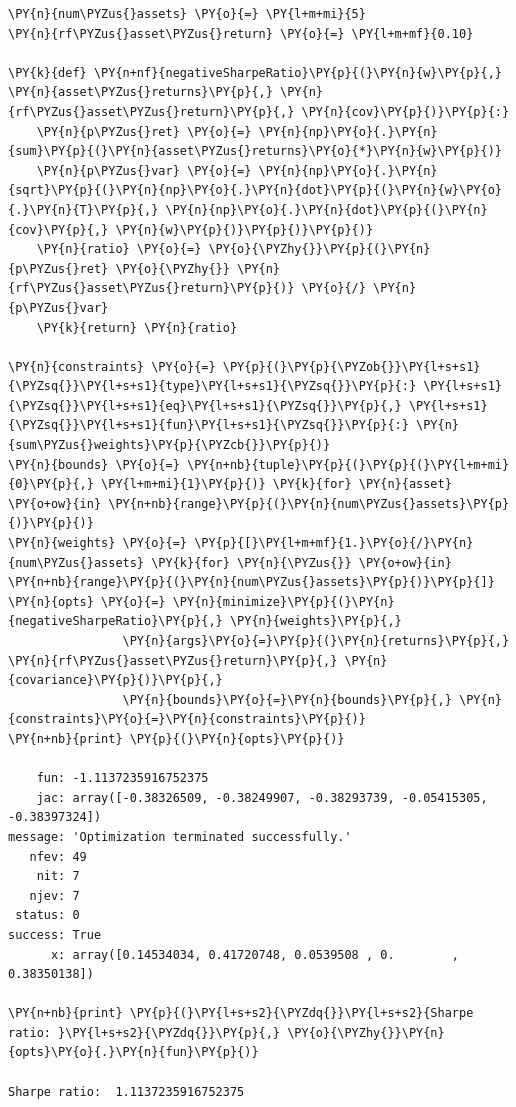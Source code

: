 \begin{tcolorbox}[breakable, size=fbox, boxrule=1pt, pad at break*=1mm,colback=cellbackground, colframe=cellborder]
\begin{Verbatim}[commandchars=\\\{\}]
\PY{n}{num\PYZus{}assets} \PY{o}{=} \PY{l+m+mi}{5}
\PY{n}{rf\PYZus{}asset\PYZus{}return} \PY{o}{=} \PY{l+m+mf}{0.10}
	
\PY{k}{def} \PY{n+nf}{negativeSharpeRatio}\PY{p}{(}\PY{n}{w}\PY{p}{,} \PY{n}{asset\PYZus{}returns}\PY{p}{,} \PY{n}{rf\PYZus{}asset\PYZus{}return}\PY{p}{,} \PY{n}{cov}\PY{p}{)}\PY{p}{:} 
    \PY{n}{p\PYZus{}ret} \PY{o}{=} \PY{n}{np}\PY{o}{.}\PY{n}{sum}\PY{p}{(}\PY{n}{asset\PYZus{}returns}\PY{o}{*}\PY{n}{w}\PY{p}{)}
    \PY{n}{p\PYZus{}var} \PY{o}{=} \PY{n}{np}\PY{o}{.}\PY{n}{sqrt}\PY{p}{(}\PY{n}{np}\PY{o}{.}\PY{n}{dot}\PY{p}{(}\PY{n}{w}\PY{o}{.}\PY{n}{T}\PY{p}{,} \PY{n}{np}\PY{o}{.}\PY{n}{dot}\PY{p}{(}\PY{n}{cov}\PY{p}{,} \PY{n}{w}\PY{p}{)}\PY{p}{)}\PY{p}{)}
    \PY{n}{ratio} \PY{o}{=} \PY{o}{\PYZhy{}}\PY{p}{(}\PY{n}{p\PYZus{}ret} \PY{o}{\PYZhy{}} \PY{n}{rf\PYZus{}asset\PYZus{}return}\PY{p}{)} \PY{o}{/} \PY{n}{p\PYZus{}var}
    \PY{k}{return} \PY{n}{ratio}
	
\PY{n}{constraints} \PY{o}{=} \PY{p}{(}\PY{p}{\PYZob{}}\PY{l+s+s1}{\PYZsq{}}\PY{l+s+s1}{type}\PY{l+s+s1}{\PYZsq{}}\PY{p}{:} \PY{l+s+s1}{\PYZsq{}}\PY{l+s+s1}{eq}\PY{l+s+s1}{\PYZsq{}}\PY{p}{,} \PY{l+s+s1}{\PYZsq{}}\PY{l+s+s1}{fun}\PY{l+s+s1}{\PYZsq{}}\PY{p}{:} \PY{n}{sum\PYZus{}weights}\PY{p}{\PYZcb{}}\PY{p}{)}
\PY{n}{bounds} \PY{o}{=} \PY{n+nb}{tuple}\PY{p}{(}\PY{p}{(}\PY{l+m+mi}{0}\PY{p}{,} \PY{l+m+mi}{1}\PY{p}{)} \PY{k}{for} \PY{n}{asset} \PY{o+ow}{in} \PY{n+nb}{range}\PY{p}{(}\PY{n}{num\PYZus{}assets}\PY{p}{)}\PY{p}{)}
\PY{n}{weights} \PY{o}{=} \PY{p}{[}\PY{l+m+mf}{1.}\PY{o}{/}\PY{n}{num\PYZus{}assets} \PY{k}{for} \PY{n}{\PYZus{}} \PY{o+ow}{in} \PY{n+nb}{range}\PY{p}{(}\PY{n}{num\PYZus{}assets}\PY{p}{)}\PY{p}{]}
\PY{n}{opts} \PY{o}{=} \PY{n}{minimize}\PY{p}{(}\PY{n}{negativeSharpeRatio}\PY{p}{,} \PY{n}{weights}\PY{p}{,} 
                \PY{n}{args}\PY{o}{=}\PY{p}{(}\PY{n}{returns}\PY{p}{,} \PY{n}{rf\PYZus{}asset\PYZus{}return}\PY{p}{,} \PY{n}{covariance}\PY{p}{)}\PY{p}{,}
                \PY{n}{bounds}\PY{o}{=}\PY{n}{bounds}\PY{p}{,} \PY{n}{constraints}\PY{o}{=}\PY{n}{constraints}\PY{p}{)}
\PY{n+nb}{print} \PY{p}{(}\PY{n}{opts}\PY{p}{)}

    fun: -1.1137235916752375
    jac: array([-0.38326509, -0.38249907, -0.38293739, -0.05415305,
-0.38397324])
message: 'Optimization terminated successfully.'
   nfev: 49
    nit: 7
   njev: 7
 status: 0
success: True
      x: array([0.14534034, 0.41720748, 0.0539508 , 0.        , 0.38350138])

\PY{n+nb}{print} \PY{p}{(}\PY{l+s+s2}{\PYZdq{}}\PY{l+s+s2}{Sharpe ratio: }\PY{l+s+s2}{\PYZdq{}}\PY{p}{,} \PY{o}{\PYZhy{}}\PY{n}{opts}\PY{o}{.}\PY{n}{fun}\PY{p}{)}

Sharpe ratio:  1.1137235916752375
\end{Verbatim}
\end{tcolorbox}


